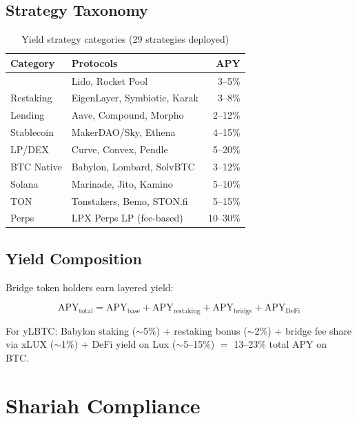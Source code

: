 \documentclass[11pt,twocolumn]{article}
\begin{document}
\subsection{Strategy Taxonomy}

\begin{table}[h]
\centering
\small
\begin{tabular}{llr}
\toprule
\textbf{Category} & \textbf{Protocols} & \textbf{APY} \\
\midrule
 & Lido, Rocket Pool & 3--5\% \\
Restaking & EigenLayer, Symbiotic, Karak & 3--8\% \\
Lending & Aave, Compound, Morpho & 2--12\% \\
Stablecoin & MakerDAO/Sky, Ethena & 4--15\% \\
LP/DEX & Curve, Convex, Pendle & 5--20\% \\
BTC Native & Babylon, Lombard, SolvBTC & 3--12\% \\
Solana & Marinade, Jito, Kamino & 5--10\% \\
TON & Tonstakers, Bemo, STON.fi & 5--15\% \\
Perps & LPX Perps LP (fee-based) & 10--30\% \\
\bottomrule
\end{tabular}
\caption{Yield strategy categories (29 strategies deployed)}
\label{tab:strategies}
\end{table}

\subsection{Yield Composition}

Bridge token holders earn layered yield:

\begin{equation}
  \text{APY}_{\text{total}} = \text{APY}_{\text{base}} + \text{APY}_{\text{restaking}} + \text{APY}_{\text{bridge}} + \text{APY}_{\text{DeFi}}
\end{equation}

For yLBTC: Babylon staking ($\sim$5\%) $+$ restaking bonus ($\sim$2\%) $+$ bridge fee share via xLUX ($\sim$1\%) $+$ DeFi yield on Lux ($\sim$5--15\%) $=$ 13--23\% total APY on BTC.

\section{Shariah Compliance}
\end{document}
